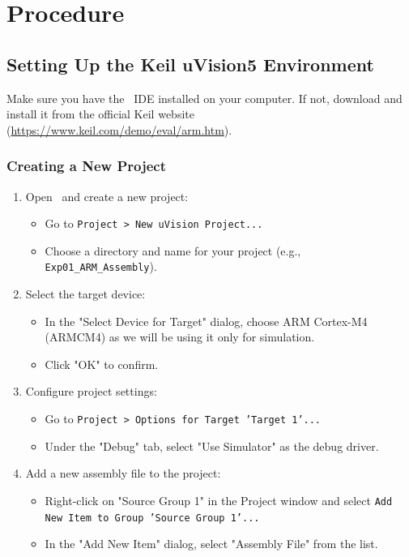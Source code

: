 \newpage
\section{Procedure}
\subsection{Setting Up the Keil uVision5 Environment}
Make sure you have the \keil\ IDE installed on your computer. If not, download and install it from the official Keil website (\url{https://www.keil.com/demo/eval/arm.htm}). 
\subsubsection{Creating a New Project}
\begin{enumerate}[nosep]
    \item Open \keil\ and create a new project:
    \begin{itemize}[nosep]
        \item Go to \texttt{Project > New uVision Project...}
        \item Choose a directory and name for your project (e.g., \texttt{Exp01\_ARM\_Assembly}).
    \end{itemize}
    \item Select the target device:
    \begin{itemize}[nosep]
        \item In the "Select Device for Target" dialog, choose ARM Cortex-M4 (ARMCM4) as we will be using it only for simulation.
        \item Click "OK" to confirm.
    \end{itemize}
    \item Configure project settings:
    \begin{itemize}[nosep]
        \item Go to \texttt{Project > Options for Target 'Target 1'...}
        \item Under the "Debug" tab, select "Use Simulator" as the debug driver.
    \end{itemize}
    \item Add a new assembly file to the project:
    \begin{itemize}[nosep]
        \item Right-click on "Source Group 1" in the Project window and select \texttt{Add New Item to Group 'Source Group 1'...}
        \item In the "Add New Item" dialog, select "Assembly File" from the list.

\end{itemize}
\end{enumerate}
